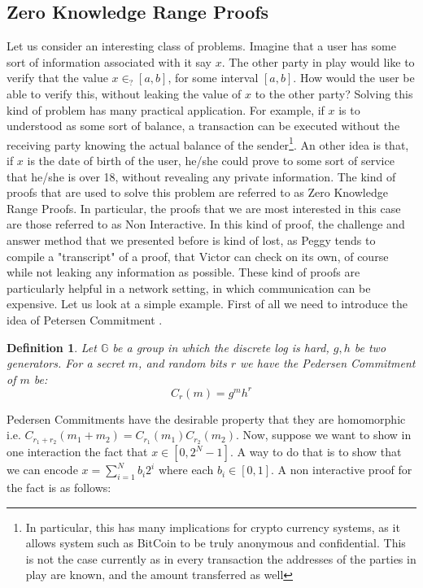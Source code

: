 \documentclass{article}
\newtheorem{definition}{Definition}
\begin{document}
\subsection{Zero Knowledge Range Proofs}
Let us consider an interesting class of problems. Imagine that a user has some sort of information associated
with it say $x$. The other party in play would like to verify that the value $x \in_? [a, b]$, for some 
interval $[a, b]$. How would the user be able to verify this, without leaking the value of $x$ to the 
other party? Solving this kind of problem has many practical application. For example, if $x$ is to 
understood as some sort of balance, a transaction can be executed without the receiving party knowing the 
actual balance of the sender\footnote{In particular, this has many implications for crypto currency systems,
as it allows system such as BitCoin to be truly anonymous and confidential. This is not the case currently
as in every transaction the addresses of the parties in play are known, and the amount transferred as well}.
An other idea is that, if $x$ is the date of birth of the user, he/she could 
prove to some sort of service that he/she is over 18, without revealing any private information. The kind 
of proofs that are used to solve this problem are referred to as Zero Knowledge Range Proofs. In particular,
the proofs that we are most interested in this case are those referred to as Non Interactive. In this kind 
of proof, the challenge and answer method that we presented before is kind of lost, as Peggy tends to 
compile a "transcript" of a proof, that Victor can check on its own, of course while not leaking any information 
as possible. These kind of proofs are particularly helpful in a network setting, in which communication can 
be expensive. Let us look at a simple example. First of all we need to introduce the idea of Petersen Commitment \cite{pedersenNonInteractiveInformationTheoreticSecure1992}.
\begin{definition}
    Let $\mathbb{G}$ be a group in which the discrete log is hard, $g, h$ be two generators. 
    For a secret $m$, and random bits $r$ we have the Pedersen Commitment of $m$ be:
    \[ C_r(m) = g^m h^r \]
\end{definition}
Pedersen Commitments have the desirable property that they are homomorphic i.e. $C_{r_1 + r_2}(m_1 + m_2) = C_{r_1}(m_1) C_{r_2}(m_2)$.
Now, suppose we want to show in one interaction the fact that $x \in [0, 2^N -1]$. A way to do that is to show
that we can encode $x =\sum^N_{i=1} b_i 2^i$ where each $b_i \in [0, 1]$. A non interactive proof \cite{boudotEfficientProofsThat2000} for the fact is as follows:
\end{document}
